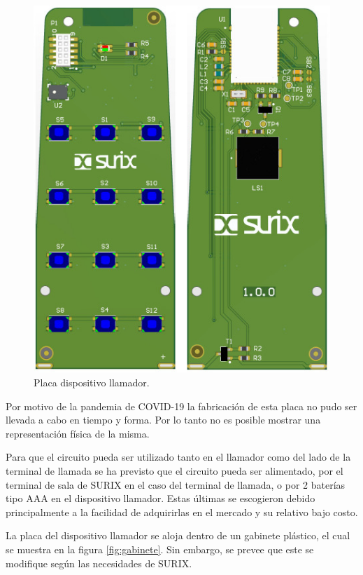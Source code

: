 \begin{figure}[htpb]
	\centering
	\includegraphics[scale=0.6]{./Figures/placas.jpeg}
	\caption{Placa dispositivo llamador.}
	\label{fig:pcb}
\end{figure}

Por motivo de la pandemia de COVID-19 la fabricación de esta placa no pudo ser llevada a cabo en tiempo y forma. Por lo tanto no es posible mostrar una representación física de la misma.

Para que el circuito pueda ser utilizado tanto en el llamador como del lado de la terminal de llamada se ha previsto que el circuito pueda ser alimentado, por el terminal de sala de SURIX en el caso del terminal de llamada, o por 2 baterías tipo AAA en el dispositivo llamador. Estas últimas se escogieron debido principalmente a la facilidad de adquirirlas en el mercado y su relativo bajo costo.

La placa del dispositivo llamador se aloja dentro de un gabinete plástico, el cual se muestra en la figura \ref{fig:gabinete}. Sin embargo, se prevee que este se modifique según las necesidades de SURIX.

